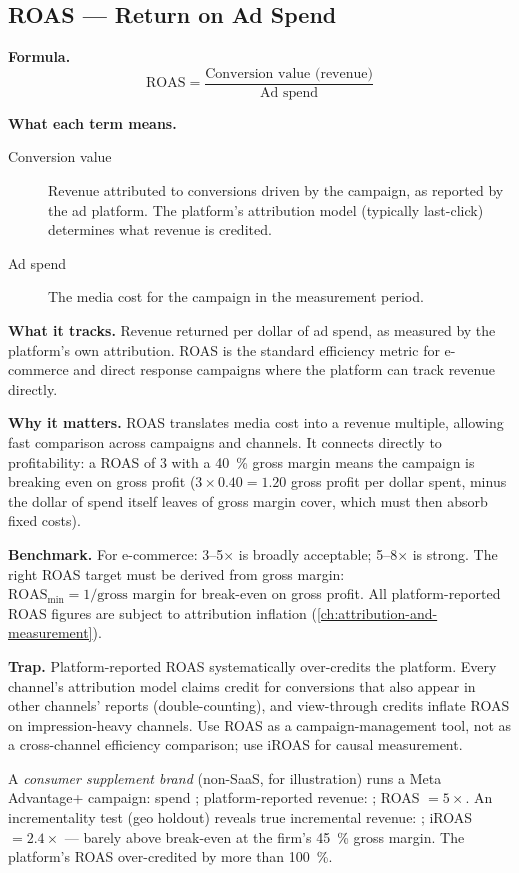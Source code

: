 \subsection{ROAS --- Return on Ad Spend}

\textbf{Formula.}
\[
  \mathrm{ROAS} = \frac{\text{Conversion value (revenue)}}{\text{Ad spend}}
\]

\textbf{What each term means.}
\begin{description}
  \item[Conversion value] Revenue attributed to conversions driven by the campaign, as
    reported by the ad platform. The platform's attribution model (typically last-click)
    determines what revenue is credited.
  \item[Ad spend] The media cost for the campaign in the measurement period.
\end{description}

\textbf{What it tracks.} Revenue returned per dollar of ad spend, as measured by the
platform's own attribution. ROAS is the standard efficiency metric for e-commerce and direct
response campaigns where the platform can track revenue directly.

\textbf{Why it matters.} ROAS translates media cost into a revenue multiple, allowing fast
comparison across campaigns and channels. It connects directly to profitability: a ROAS of
3 with a \qty{40}{\percent} gross margin means the campaign is breaking even on gross profit
($3 \times 0.40 = 1.20$ gross profit per dollar spent, minus the dollar of spend itself
leaves  of gross margin cover, which must then absorb fixed costs).

\textbf{Benchmark.} For e-commerce: 3--5$\times$ is broadly acceptable; 5--8$\times$ is
strong. The right ROAS target must be derived from gross margin: $\mathrm{ROAS}_{\min} =
1/\text{gross margin}$ for break-even on gross profit. All platform-reported ROAS figures
are subject to attribution inflation (\cref{ch:attribution-and-measurement}).

\textbf{Trap.} Platform-reported ROAS systematically over-credits the platform. Every
channel's attribution model claims credit for conversions that also appear in other channels'
reports (double-counting), and view-through credits inflate ROAS on impression-heavy
channels. Use ROAS as a campaign-management tool, not as a cross-channel efficiency
comparison; use iROAS for causal measurement.

\begin{example}
A \textit{consumer supplement brand} (non-SaaS, for illustration) runs a Meta Advantage+
campaign: spend ; platform-reported revenue: ; ROAS $= 5\times$.
An incrementality test (geo holdout) reveals true incremental revenue: ;
iROAS $= 2.4\times$ --- barely above break-even at the firm's \qty{45}{\percent} gross
margin. The platform's ROAS over-credited by more than \qty{100}{\percent}.
\end{example}


